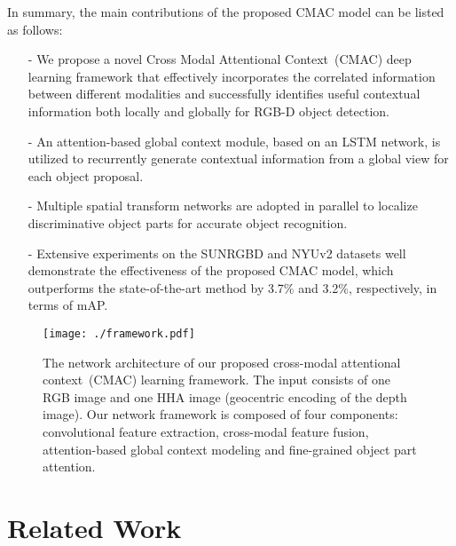 \documentclass[journal]{IEEEtran}
\begin{document}
In summary, the main contributions of the proposed CMAC model can be listed as follows:







\begin{itemize}
\item[-] We propose a novel Cross Modal Attentional Context~(CMAC) deep learning framework that effectively incorporates the correlated information between different modalities and successfully identifies useful contextual information both locally and globally for RGB-D object detection.
\item[-] An attention-based global context module, based on an LSTM network, is utilized to recurrently generate contextual information from a global view for each object proposal.
\item[-] Multiple spatial transform networks are adopted in parallel to localize discriminative object parts for accurate object recognition. 
\item[-] Extensive experiments on the SUNRGBD and NYUv2 datasets well demonstrate the effectiveness of the proposed CMAC model, which outperforms the state-of-the-art method \cite{gupta2016cross} by 3.7\% and 3.2\%, respectively, in terms of mAP. 
\end{itemize}

\begin{figure*}
  \centering
  \texttt{[image: ./framework.pdf]}
  \caption{\label{fig:framework} The network architecture of our proposed cross-modal attentional context~(CMAC) learning framework. The input consists of one RGB image and one HHA image (geocentric encoding of the depth image). Our network framework is composed of four components: convolutional feature extraction, cross-modal feature fusion, attention-based global context modeling and fine-grained object part attention.}
\end{figure*}

\section{Related Work}
\end{document}
